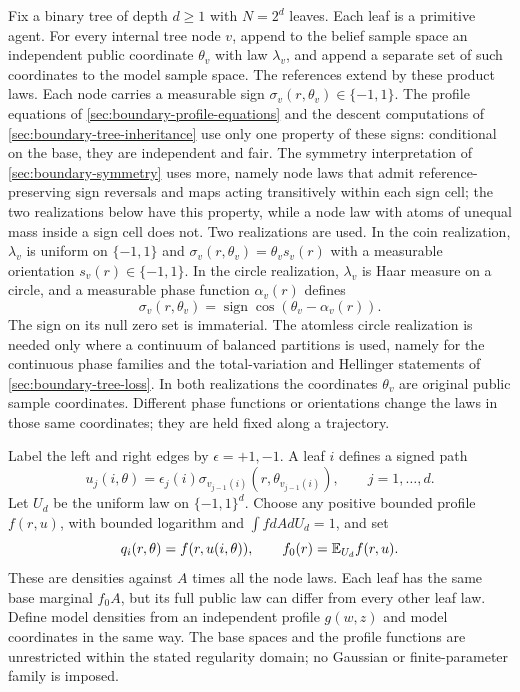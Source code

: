 Fix a binary tree of depth $d\ge1$ with $N=2^d$ leaves. Each leaf is a primitive agent. For every internal tree node $v$, append to the belief sample space an independent public coordinate $\theta_v$ with law $\lambda_v$, and append a separate set of such coordinates to the model sample space. The references extend by these product laws. Each node carries a measurable sign $\sigma_v(r,\theta_v)\in\{-1,1\}$. The profile equations of \cref{sec:boundary-profile-equations} and the descent computations of \cref{sec:boundary-tree-inheritance} use only one property of these signs: conditional on the base, they are independent and fair. The symmetry interpretation of \cref{sec:boundary-symmetry} uses more, namely node laws that admit reference-preserving sign reversals and maps acting transitively within each sign cell; the two realizations below have this property, while a node law with atoms of unequal mass inside a sign cell does not. Two realizations are used. In the coin realization, $\lambda_v$ is uniform on $\{-1,1\}$ and $\sigma_v(r,\theta_v)=\theta_vs_v(r)$ with a measurable orientation $s_v(r)\in\{-1,1\}$. In the circle realization, $\lambda_v$ is Haar measure on a circle, and a measurable phase function $\alpha_v(r)$ defines
\begin{equation}
 \sigma_v(r,\theta_v)=\operatorname{sign}\cos(\theta_v-\alpha_v(r)).
 \label{eq:boundary-tree-signs}
\end{equation}
The sign on its null zero set is immaterial. The atomless circle realization is needed only where a continuum of balanced partitions is used, namely for the continuous phase families and the total-variation and Hellinger statements of \cref{sec:boundary-tree-loss}. In both realizations the coordinates $\theta_v$ are original public sample coordinates. Different phase functions or orientations change the laws in those same coordinates; they are held fixed along a trajectory.

Label the left and right edges by $\epsilon=+1,-1$. A leaf $i$ defines a signed path
\begin{equation}
 u_j(i,\theta)=\epsilon_j(i)\sigma_{v_{j-1}(i)}(r,\theta_{v_{j-1}(i)}),
 \qquad j=1,\ldots,d.
 \label{eq:boundary-path-bits}
\end{equation}
Let $U_d$ be the uniform law on $\{-1,1\}^d$. Choose any positive bounded profile $f(r,u)$, with bounded logarithm and $\int f dA dU_d=1$, and set
\begin{equation}
 q_i(r,\theta)=f(r,u(i,\theta)),\qquad
 f_0(r)=\mathbb E_{U_d}f(r,u).
 \label{eq:boundary-profile-lift}
\end{equation}
These are densities against $A$ times all the node laws. Each leaf has the same base marginal $f_0A$, but its full public law can differ from every other leaf law. Define model densities from an independent profile $g(w,z)$ and model coordinates in the same way. The base spaces and the profile functions are unrestricted within the stated regularity domain; no Gaussian or finite-parameter family is imposed.

